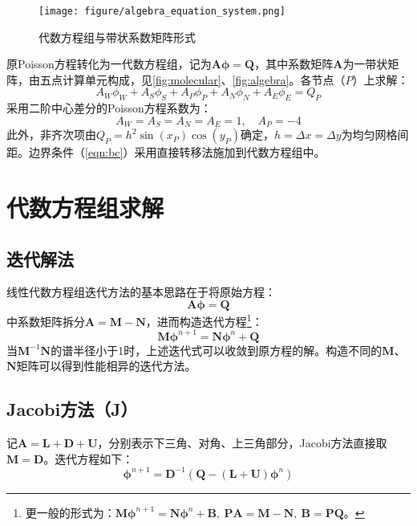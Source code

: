 \documentclass[11pt]{article}
\begin{document}
\begin{figure}[htbp]
	\centering
	\texttt{[image: figure/algebra\_equation\_system.png]}
	\caption{\label{fig:algebra}代数方程组与带状系数矩阵形式\citep{ferziger_computational_2020}}
\end{figure}

原Poisson方程转化为一代数方程组，记为$\bm{A}\bm{\phi}=\bm{Q}$，其中系数矩阵$\bm{A}$为一带状矩阵，由五点计算单元构成，见\autoref{fig:molecular}、\autoref{fig:algebra}。各节点（$P$）上求解：
\begin{equation}
	A_W\phi_W+A_S\phi_S+A_P\phi_P+A_N\phi_N+A_E\phi_E=Q_P
\end{equation}
采用二阶中心差分的Poisson方程系数为：
\begin{equation}
	A_W=A_S=A_N=A_E=1,\quad A_P=-4
\end{equation}
此外，非齐次项由$Q_P=h^2\sin(x_P)\cos(y_P)$确定，$h=\Delta x=\Delta y$为均匀网格间距。边界条件（\autoref{eqn:bc}）采用直接转移法施加到代数方程组中。

\section{代数方程组求解}
\subsection{迭代解法}
线性代数方程组迭代方法的基本思路在于将原始方程：
\begin{equation}
	\bm{A}\bm{\phi}=\bm{Q}
\end{equation}
中系数矩阵拆分$\bm{A}=\bm{M}-\bm{N}$，进而构造迭代方程\footnote{更一般的形式为：$\bm{M}\bm{\phi}^{n+1}=\bm{N}\bm{\phi}^n+\bm{B},\ \bm{PA}=\bm{M-N},\ \bm{B}=\bm{PQ}$。}：
\begin{equation}
	\bm{M}\bm{\phi}^{n+1}=\bm{N}\bm{\phi}^n+\bm{Q}
\end{equation}
当$\bm{M}^{-1}\bm{N}$的谱半径小于1时，上述迭代式可以收敛到原方程的解。构造不同的$\bm{M}$、$\bm{N}$矩阵可以得到性能相异的迭代方法。

\subsection{Jacobi方法（J）}
记$\bm{A}=\bm{L+D+U}$，分别表示下三角、对角、上三角部分，Jacobi方法直接取$\bm{M}=\bm{D}$。迭代方程如下\cite{sauer_numerical_2018}：
\begin{equation}
	\bm{\phi}^{n+1}=\bm{D}^{-1}\left(\bm{Q}-\left(\bm{L+U}\right)\bm{\phi}^n\right)
\end{equation}
\end{document}
